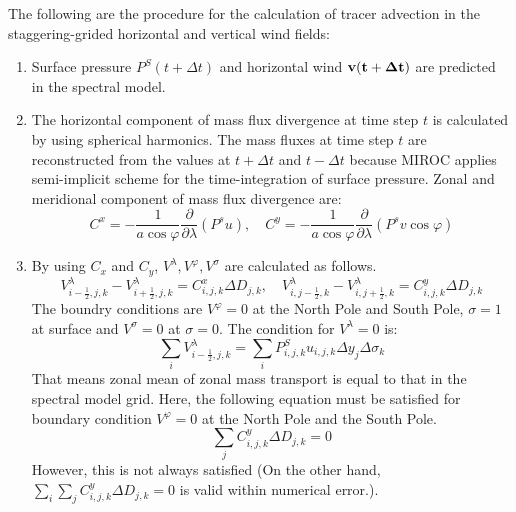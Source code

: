 \documentclass{article}
\begin{document}
The following are the procedure for the calculation of tracer advection in the staggering-grided horizontal and vertical wind fields:
\begin{enumerate}
\item Surface pressure $P^{S}(t+\Delta t)$ and horizontal wind $\bf{v}(t+\Delta t)$ are predicted in the spectral model.
\item The horizontal component of mass flux divergence at time step $t$ is calculated by using spherical harmonics. The mass fluxes at time step $t$ are reconstructed from the values at $t+\Delta t$ and $t-\Delta t$ because MIROC applies semi-implicit scheme for the time-integration of surface pressure. Zonal and meridional component of mass flux divergence are: 
  \begin{equation}
    C^{x}=-\frac{1}{a \cos \varphi}\frac{\partial}{\partial \lambda}(P^{s}u),\quad C^{y}=-\frac{1}{a \cos \varphi}\frac{\partial}{\partial \lambda}(P^{s}v \cos \varphi) 
  \end{equation}
\item By using $C_{x}$ and $C_{y}$, $V^{\lambda}, V^{\varphi}, V^{\sigma}$ are calculated as follows.
  \begin{equation}
    V^{\lambda}_{i-\frac{1}{2},j,k}-V^{\lambda}_{i+\frac{1}{2},j,k}=C^{x}_{i,j,k}\Delta D_{j,k}, \quad V^{\lambda}_{i,j-\frac{1}{2},k}-V^{\lambda}_{i,j+\frac{1}{2},k}=C^{y}_{i,j,k}\Delta D_{j,k}
  \end{equation}
  The boundry conditions are $V^{\varphi}=0$ at the North Pole and South Pole, $\sigma=1$ at surface and $V^{\sigma}=0$ at $\sigma=0$.
The condition for $V^{\lambda}=0$ is:
  \begin{equation}
    \sum_{i}V^{\lambda}_{i-\frac{1}{2},j,k}=\sum_{i}P^{S}_{i,j,k}u_{i,j,k}\Delta y_{j}\Delta \sigma_{k}
  \end{equation}
  That means zonal mean of zonal mass transport is equal to that in the spectral model grid.
  Here, the following equation must be satisfied for boundary condition $V^{\varphi}=0$ at the North Pole and the South Pole. 
  \begin{equation}
    \sum_{j}C^{y}_{i,j,k}\Delta D_{j,k}=0
  \end{equation}
  However, this is not always satisfied (On the other hand, $\sum_{i} \sum_{j}C^{y}_{i,j,k}\Delta D_{j,k}=0$ is valid within numerical error.).


\end{enumerate}
\end{document}
